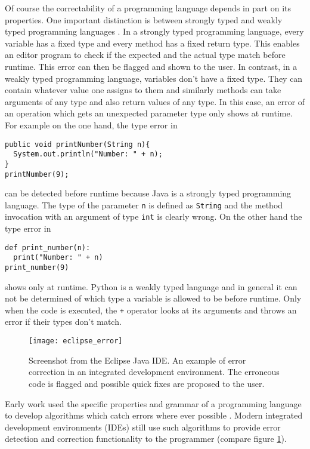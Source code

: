 Of course the correctability of a programming language depends in part on its properties. One important distinction is between strongly typed and weakly typed programming languages \cite{pl_typing}. In a strongly typed programming language, every variable has a fixed type and every method has a fixed return type. This enables an editor program to check if the expected and the actual type match before runtime. This error can then be flagged and shown to the user. In contrast, in a weakly typed programming language, variables don't have a fixed type. They can contain whatever value one assigns to them and similarly methods can take arguments of any type and also return values of any type. In this case, an error of an operation which gets an unexpected parameter type only shows at runtime. For example on the one hand, the type error in

\lstset{belowskip=3mm}
\begin{lstlisting}
public void printNumber(String n){
  System.out.println("Number: " + n);
}
printNumber(9);
\end{lstlisting}

\noindent can be detected before runtime because Java is a strongly typed programming language. The type of the parameter \texttt{n} is defined as \texttt{String} and the method invocation with an argument of type \texttt{int} is clearly wrong. On the other hand the type error in

\lstset{language=Python}
\begin{lstlisting}
def print_number(n):
  print("Number: " + n)
print_number(9)
\end{lstlisting}
\lstset{language=Java}
\lstset{belowskip=0mm}

\noindent shows only at runtime. Python is a weakly typed language and in general it can not be determined of which type a variable is allowed to be before runtime. Only when the code is executed, the \texttt{+} operator looks at its arguments and throws an error if their types don't match.

\begin{figure}[t]
\centering
\texttt{[image: eclipse\_error]}
\caption{Screenshot from the Eclipse Java IDE. An example of error correction in an integrated development environment. The erroneous code is flagged and possible quick fixes are proposed to the user.}
\label{ide_correction}
\end{figure}

Early work used the specific properties and grammar of a programming language to develop algorithms which catch errors where ever possible \cite{syntax_correction_in_pl, analysis_for_editors}. Modern integrated development environments (IDEs) still use such algorithms to provide error detection and correction functionality to the programmer (compare figure \ref{ide_correction}).

